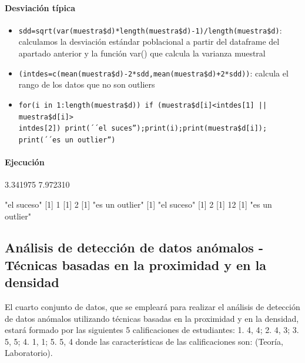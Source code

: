 \documentclass[a4paper, 12pt]{article}
\begin{document}
	\paragraph{Desviación típica}
	\begin{itemize}
		\item \texttt{sdd=sqrt(var(muestra\$d)*length(muestra\$d)-1)/length(muestra\$d)}: calculamos la desviación estándar poblacional a partir del dataframe del apartado anterior y la función var() que calcula la varianza muestral
		\item \texttt{(intdes=c(mean(muestra\$d)-2*sdd,mean(muestra\$d)+2*sdd))}: calcula el rango de los datos que no son outliers
		\item \texttt{for(i in 1:length(muestra\$d)) {if (muestra\$d[i]<intdes[1] || muestra\$d[i]>\\intdes[2]) {print(´´el suces'');print(i);print(muestra\$d[i]);\\print(´´es un outlier'')}}}
	\end{itemize}
	\paragraph{Ejecución}
\begin{Schunk}
\begin{Soutput}
[1] 3.341975 7.972310
\end{Soutput}
\begin{Soutput}
[1] "el suceso"
[1] 1
[1] 2
[1] "es un outlier"
[1] "el suceso"
[1] 2
[1] 12
[1] "es un outlier"
\end{Soutput}
\end{Schunk}
	\subsection{Análisis de detección de datos anómalos - Técnicas basadas en la proximidad y en la densidad}
	El cuarto conjunto de datos, que se empleará para realizar el análisis de detección de datos anómalos utilizando técnicas basadas en la proximidad y en la densidad, estará formado por las siguientes 5 calificaciones de estudiantes: 1. {4, 4}; 2. {4, 3}; 3. {5, 5}; 4. {1, 1}; 5. {5, 4} donde las características de las calificaciones son: (Teoría, Laboratorio).
	
\end{document}
